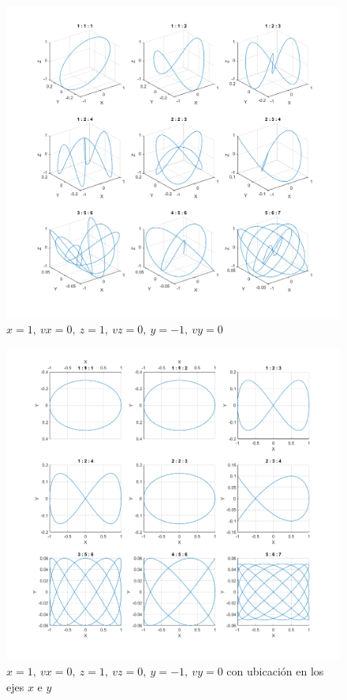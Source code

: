 \documentclass{article}
\begin{document}
\clearpage
\newpage

\begin{figure}
\centering
    \includegraphics[width=1\textwidth]{images/03e1.png}
    \caption{$x = 1,~vx = 0,~z = 1,~vz = 0,~y =-1,~vy = 0$}
\end{figure}

\clearpage
\newpage

\begin{figure}
\centering
    \includegraphics[width=1\textwidth]{images/03e2.png}
    \caption{$x = 1,~vx = 0,~z = 1,~vz = 0,~y =-1,~vy = 0$ con ubicación en los ejes $x$ e $y$}
\end{figure}
\end{document}
